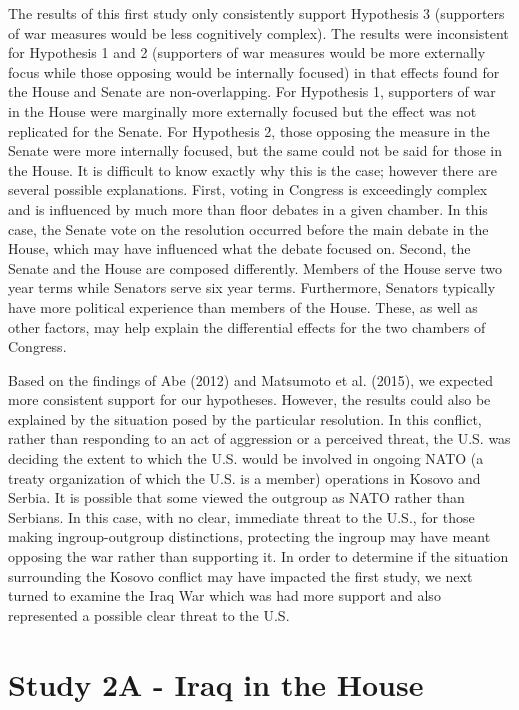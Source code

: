 \documentclass[english,,man,floatsintext]{apa6}
\begin{document}
The results of this first study only consistently support Hypothesis 3 (supporters of war measures would be less cognitively complex). The results were inconsistent for Hypothesis 1 and 2 (supporters of war measures would be more externally focus while those opposing would be internally focused) in that effects found for the House and Senate are non-overlapping. For Hypothesis 1, supporters of war in the House were marginally more externally focused but the effect was not replicated for the Senate. For Hypothesis 2, those opposing the measure in the Senate were more internally focused, but the same could not be said for those in the House.
It is difficult to know exactly why this is the case; however there are several possible explanations. First, voting in Congress is exceedingly complex and is influenced by much more than floor debates in a given chamber. In this case, the Senate vote on the resolution occurred before the main debate in the House, which may have influenced what the debate focused on. Second, the Senate and the House are composed differently. Members of the House serve two year terms while Senators serve six year terms. Furthermore, Senators typically have more political experience than members of the House. These, as well as other factors, may help explain the differential effects for the two chambers of Congress.

Based on the findings of Abe (2012) and Matsumoto et al. (2015), we expected more consistent support for our hypotheses. However, the results could also be explained by the situation posed by the particular resolution. In this conflict, rather than responding to an act of aggression or a perceived threat, the U.S. was deciding the extent to which the U.S. would be involved in ongoing NATO (a treaty organization of which the U.S. is a member) operations in Kosovo and Serbia. It is possible that some viewed the outgroup as NATO rather than Serbians. In this case, with no clear, immediate threat to the U.S., for those making ingroup-outgroup distinctions, protecting the ingroup may have meant opposing the war rather than supporting it. In order to determine if the situation surrounding the Kosovo conflict may have impacted the first study, we next turned to examine the Iraq War which was had more support and also represented a possible clear threat to the U.S.

\hypertarget{study-2a---iraq-in-the-house}{%
\section{Study 2A - Iraq in the House}\label{study-2a---iraq-in-the-house}}
\end{document}

